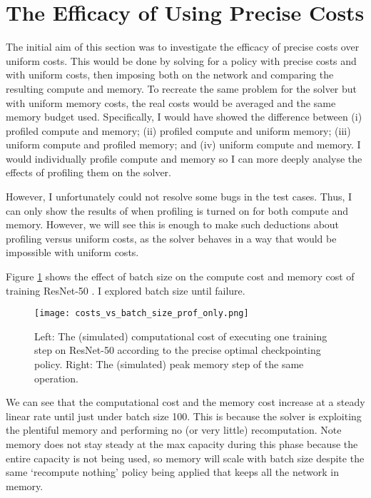 \section{The Efficacy of Using Precise Costs}
The initial aim of this section was to investigate the efficacy of precise costs over uniform costs.
This would be done by solving for a policy with precise costs and with uniform costs, then imposing both on the network and comparing the resulting compute and memory.
To recreate the same problem for the solver but with uniform memory costs, the real costs would be averaged and the same memory budget used.
Specifically, I would have showed the difference between (i) profiled compute and memory; (ii) profiled compute and uniform memory; (iii) uniform compute and profiled memory; and (iv) uniform compute and memory.
I would individually profile compute and memory so I can more deeply analyse the effects of profiling them on the solver.

However, I unfortunately could not resolve some bugs in the test cases.
Thus, I can only show the results of when profiling is turned on for both compute and memory.
However, we will see this is enough to make such deductions about profiling versus uniform costs, as the solver behaves in a way that would be impossible with uniform costs.

Figure \ref{fig:3-prof-results} shows the effect of batch size on the compute cost and memory cost of training ResNet-50 \cite{He2016-resnet}.
I explored batch size until failure.

\begin{figure}[h]
    \centering
    \texttt{[image: costs\_vs\_batch\_size\_prof\_only.png]}
    \caption{Left: The (simulated) computational cost of executing one training step on ResNet-50 according to the precise optimal checkpointing policy. Right: The (simulated) peak memory step of the same operation.}
    \label{fig:3-prof-results}
\end{figure}

We can see that the computational cost and the memory cost increase at a steady linear rate until just under batch size 100.
This is because the solver is exploiting the plentiful memory and performing no (or very little) recomputation.
Note memory does not stay steady at the max capacity during this phase because the entire capacity is not being used,
so memory will scale with batch size despite the same `recompute nothing' policy being applied that keeps all the network in memory.

